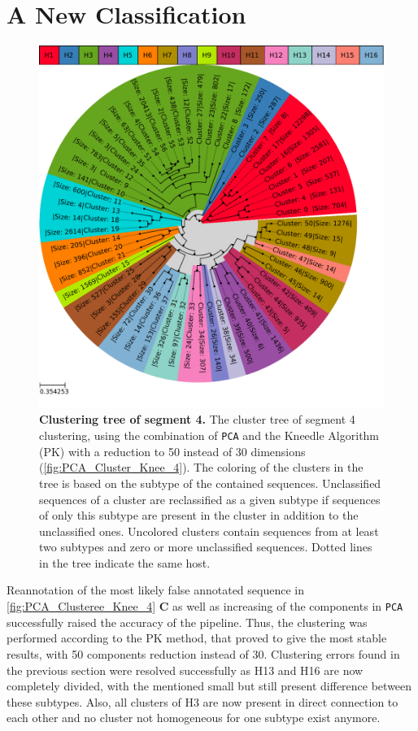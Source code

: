 \section{A New Classification} \label{sec:Serotype_Classification}

\begin{figure}[!hbt]
    \centering
    \includegraphics[width=\textwidth]{Results/Clustertree_Segment_4.pdf}
    \caption[Clustering tree of segment 4]{\textbf{Clustering tree of segment 4.} The cluster tree of segment 4 clustering, using the combination of \texttt{PCA} and the Kneedle Algorithm (PK) with a reduction to 50 instead of 30 dimensions (\autoref{fig:PCA_Cluster_Knee_4}). The coloring of the clusters in the tree is based on the subtype of the contained sequences. Unclassified sequences of a cluster are reclassified as a given subtype if sequences of only this subtype are present in the cluster in addition to the unclassified ones. Uncolored clusters contain sequences from at least two subtypes and zero or more unclassified sequences. Dotted lines in the tree indicate the same host.}
    \label{fig:Result_Clustertree_Segment_4}
\end{figure}

Reannotation of the most likely false annotated sequence in \autoref{fig:PCA_Clusteree_Knee_4} \textbf{\textsf{C}} as well as increasing of the components in \texttt{PCA} successfully raised the accuracy of the pipeline. Thus, the clustering was performed according to the PK method, that proved to give the most stable results, with 50 components reduction instead of 30. Clustering errors found in the previous section were resolved successfully as H13 and H16 are now completely divided, with the mentioned small but still present difference between these subtypes. Also, all clusters of H3 are now present in direct connection to each other and no cluster not homogeneous for one subtype exist anymore.

